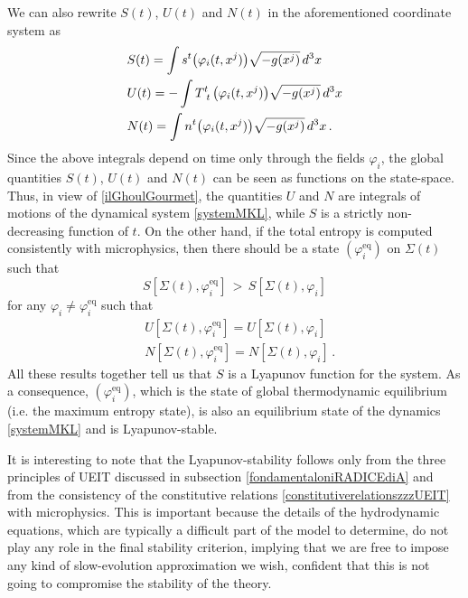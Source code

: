 \documentclass[a4paper, amsfonts, amssymb, amsmath, reprint, twocolumn, showkeys, nofootinbib]{revtex4-2}
\begin{document}
We can also rewrite $S(t)$, $U(t)$ and $N(t)$ in the aforementioned coordinate system as \cite{carroll_2019}
%
\begin{equation}
\begin{split}
& S(t) = \int s^t \big(\varphi_i(t,x^j) \big) \sqrt{-g(x^j)} \, d^3 x \\
& U(t) = -\int T\indices{^t _t} \big(\varphi_i(t,x^j) \big) \sqrt{-g(x^j)} \, d^3 x \\
& N(t) = \int n^t \big(\varphi_i(t,x^j) \big)\sqrt{-g(x^j)} \, d^3 x \, . 
\end{split}
\end{equation}
%
Since the above integrals depend on time only through the fields $\varphi_i$, the global quantities  $S(t)$, $U(t)$ and $N(t)$  can be seen as functions on the state-space. Thus, in view of \eqref{ilGhoulGourmet}, the quantities $U$ and $N$ are integrals of motions of the dynamical system \eqref{systemMKL}, while $S$ is a strictly non-decreasing function of $t$. On the other hand, if the total entropy is computed consistently with microphysics, then there should be a state $(\varphi_i^{\text{eq}})$ on $\Sigma(t)$ such that
\begin{equation}
S[\Sigma(t),\varphi_i^{\text{eq}}] \, > \,  S[\Sigma(t),\varphi_i]    
\end{equation}
for any $\varphi_i \neq \varphi_i^{\text{eq}}$ such that
\begin{equation}
\begin{split}
& U[\Sigma(t),\varphi_i^{\text{eq}}] = U[\Sigma(t),\varphi_i]
\\ %
& N[\Sigma(t),\varphi_i^{\text{eq}}] = N[\Sigma(t),\varphi_i] \, .
\end{split}
\end{equation}
All these results together tell us  that $S$ is a Lyapunov function for the system. 
As a consequence, $(\varphi_i^{\text{eq}})$, which is the state of global thermodynamic equilibrium (i.e. the maximum entropy state), is also an equilibrium state of the dynamics \eqref{systemMKL} and is Lyapunov-stable.

It is interesting to note that the Lyapunov-stability follows only from the three principles of UEIT discussed in subsection \ref{fondamentaloniRADICEdiA} and from the consistency of the constitutive relations \eqref{constitutiverelationszzzUEIT} with microphysics. This is important because the details of the hydrodynamic equations, which are typically a difficult part of the model to determine, do not play any role in the final stability criterion, implying that we are  free to impose any kind of slow-evolution approximation we wish, confident that this is not going to compromise the stability of the theory.
\end{document}
